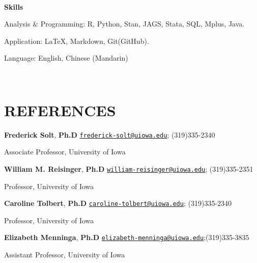 \documentclass[10.5pt,]{article}
\providecommand{\tightlist}{%
	\setlength{\itemsep}{0pt}\setlength{\parskip}{0pt}}
\renewenvironment{itemize}{
	\begin{list}{}{
			\setlength{\leftmargin}{1.5em}
		}
	}{
	\end{list}
}
\begin{document}
 ~

 \begin{itemize}
 \tightlist
 \item
   \textbf{Skills}

   \begin{itemize}
   \tightlist
   \item
     Analysis \& Programming: R, Python, Stan, JAGS, Stata, SQL, Mplus,
     Java.
   \item
     Application: \LaTeX, Markdown, Git(GitHub).
   \item
     Language: English, Chinese (Mandarin)
   \end{itemize}
 \end{itemize}

 ~

 \hypertarget{references}{%
 \section{REFERENCES}\label{references}}

 \begin{itemize}
 \tightlist
 \item
   \textbf{Frederick Solt}, \textbf{Ph.D}
   \hfill  \href{mailto:frederick-solt@uiowa.edu}{\nolinkurl{frederick-solt@uiowa.edu}};
   (319)335-2340
 \item
   Associate Professor, University of Iowa
 \item
   \textbf{William M. Reisinger}, \textbf{Ph.D}
   \hfill  \href{mailto:william-reisinger@uiowa.edu}{\nolinkurl{william-reisinger@uiowa.edu}};
   (319)335-2351
 \item
   Professor, University of Iowa
 \item
   \textbf{Caroline Tolbert}, \textbf{Ph.D}
   \hfill  \href{mailto:caroline-tolbert@uiowa.edu}{\nolinkurl{caroline-tolbert@uiowa.edu}};
   (319)335-2340
 \item
   Professor, University of Iowa
 \item
   \textbf{Elizabeth Menninga}, \textbf{Ph.D}
   \hfill  \href{mailto:elizabeth-menninga@uiowa.edu}{\nolinkurl{elizabeth-menninga@uiowa.edu}};(319)335-3835
 \item
   Assistant Professor, University of Iowa
 \end{itemize}
	
			
\end{document}
